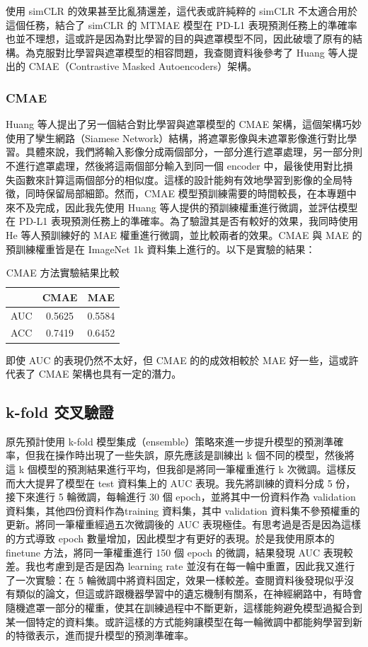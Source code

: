 \documentclass[12pt,a4paper]{article}
\begin{document}
使用 simCLR 的效果甚至比亂猜還差，這代表或許純粹的 simCLR 不太適合用於這個任務，結合了 simCLR 的 MTMAE 模型在 PD-L1 表現預測任務上的準確率也並不理想，這或許是因為對比學習的目的與遮罩模型不同，因此破壞了原有的結構。為克服對比學習與遮罩模型的相容問題，我查閱資料後參考了 Huang 等人提出的 CMAE（Contrastive Masked Autoencoders）架構。

\subsubsection{CMAE}
Huang 等人提出了另一個結合對比學習與遮罩模型的 CMAE 架構，這個架構巧妙使用了孿生網路（Siamese Network）結構，將遮罩影像與未遮罩影像進行對比學習。具體來說，我們將輸入影像分成兩個部分，一部分進行遮罩處理，另一部分則不進行遮罩處理，然後將這兩個部分輸入到同一個 encoder 中，最後使用對比損失函數來計算這兩個部分的相似度。這樣的設計能夠有效地學習到影像的全局特徵，同時保留局部細節。然而，CMAE 模型預訓練需要的時間較長，在本專題中來不及完成，因此我先使用 Huang 等人提供的預訓練權重進行微調，並評估模型在 PD-L1 表現預測任務上的準確率。為了驗證其是否有較好的效果，我同時使用 He 等人預訓練好的 MAE 權重進行微調，並比較兩者的效果。CMAE 與 MAE 的預訓練權重皆是在 ImageNet 1k 資料集上進行的。以下是實驗的結果：

\begin{table}[h]
\centering
\begin{tabular}{lcc}
\toprule
 & \textbf{CMAE} & \textbf{MAE} \\
\midrule
AUC          & 0.5625 & 0.5584 \\
ACC          & 0.7419 & 0.6452 \\
\bottomrule
\end{tabular}
\caption{CMAE 方法實驗結果比較}
\label{tab:CMAE-results}
\end{table}

即使 AUC 的表現仍然不太好，但 CMAE 的的成效相較於 MAE 好一些，這或許代表了 CMAE 架構也具有一定的潛力。

\subsection{k-fold 交叉驗證}
原先預計使用 k-fold 模型集成（ensemble）策略來進一步提升模型的預測準確率，但我在操作時出現了一些失誤，原先應該是訓練出 k 個不同的模型，然後將這 k 個模型的預測結果進行平均，但我卻是將同一筆權重進行 k 次微調。這樣反而大大提昇了模型在 test 資料集上的 AUC 表現。我先將訓練的資料分成 5 份，接下來進行 5 輪微調，每輪進行 30 個 epoch，並將其中一份資料作為 validation 資料集，其他四份資料作為training 資料集，其中 validation 資料集不參預權重的更新。將同一筆權重經過五次微調後的  AUC 表現極佳。有思考過是否是因為這樣的方式導致 epoch 數量增加，因此模型才有更好的表現。於是我使用原本的 finetune 方法，將同一筆權重進行 150 個 epoch 的微調，結果發現 AUC 表現較差。我也考慮到是否是因為 learning rate 並沒有在每一輪中重置，因此我又進行了一次實驗：在 5 輪微調中將資料固定，效果一樣較差。查閱資料後發現似乎沒有類似的論文，但這或許跟機器學習中的遺忘機制有關系，在神經網路中，有時會隨機遮罩一部分的權重，使其在訓練過程中不斷更新，這樣能夠避免模型過擬合到某一個特定的資料集。或許這樣的方式能夠讓模型在每一輪微調中都能夠學習到新的特徵表示，進而提升模型的預測準確率。
\end{document}
